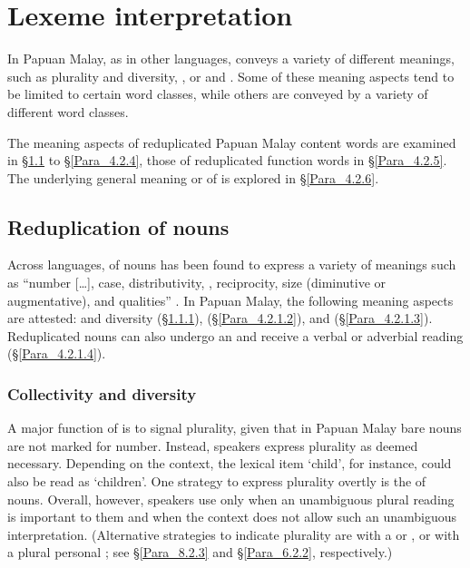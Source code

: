 \section{Lexeme interpretation}\label{Para_4.2}
In Papuan Malay, as in other languages,  conveys a variety of different meanings, such as plurality and diversity, , or  and . Some of these meaning aspects tend to be limited to certain word classes, while others are conveyed by a variety of different word classes.



The meaning aspects of reduplicated Papuan Malay content words are examined in §\ref{Para_4.2.1} to §\ref{Para_4.2.4}, those of reduplicated function words in §\ref{Para_4.2.5}. The underlying general meaning or  of  is explored in §\ref{Para_4.2.6}.


\subsection{Reduplication of nouns}\label{Para_4.2.1}
Across languages,  of nouns has been found to express a variety of meanings such as “number [\ldots], case, distributivity, , reciprocity, size (diminutive or augmentative), and  qualities” {\citep{Rubino.2013}}. In Papuan Malay, the following meaning aspects are attested:  and diversity (§\ref{Para_4.2.1.1}),  (§\ref{Para_4.2.1.2}), and  (§\ref{Para_4.2.1.3}). Reduplicated nouns can also undergo an  and receive a verbal or adverbial reading (§\ref{Para_4.2.1.4}).


\subsubsection[Collectivity and diversity]{Collectivity and diversity}
\label{Para_4.2.1.1}
A major function of   is to signal plurality, given that in Papuan Malay bare nouns are not marked for number. Instead, speakers express plurality as deemed necessary. Depending on the context, the lexical item  ‘child’, for instance, could also be read as ‘children’. One strategy to express plurality overtly is the  of nouns. Overall, however, speakers use  only when an unambiguous plural reading is important to them and when the context does not allow such an unambiguous interpretation. (Alternative strategies to indicate plurality are  with a  or , or with a plural personal ; see §\ref{Para_8.2.3} and §\ref{Para_6.2.2}, respectively.)




